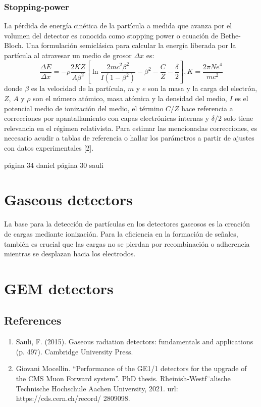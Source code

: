 \documentclass[]{book}
\begin{document}
\subsubsection{Stopping-power}

\noindent La pérdida de energía cinética de la partícula a medida que avanza por el volumen del detector es conocida como stopping power o ecuación de Bethe-Bloch. Una formulación semiclásica para calcular la energía liberada por la partícula al atravesar un medio de grosor $\Delta x$ es: $$
\frac{\Delta E}{\Delta x}=-\rho \frac{2 K Z}{A \beta^2}\left[\ln \frac{2 m c^2 \beta^2}{I\left(1-\beta^2\right)}-\beta^2-\frac{C}{Z}-\frac{\delta}{2}\right], K = \frac{2 \pi N e^{4}}{mc^{2}}
$$
donde $\beta$ es la velocidad de la partícula, $m$ y $e$ son la masa y la carga del electrón, $Z$, $A$ y $\rho$ son el número atómico, masa atómica y la densidad del medio, $I$ es el potencial medio de ionización del medio, el término $C/Z$ hace referencia a correcciones por apantallamiento con capas electrónicas internas y $\delta /2$ solo tiene relevancia en el régimen relativista. Para estimar las mencionadas correcciones, es necesario acudir a tablas de referencia o hallar los parámetros a partir de ajustes con datos experimentales [2].

página 34 daniel
página 30 sauli

\section{Gaseous detectors}

\noindent La base para la detección de partículas en los detectores gaseosos es la creación de cargas mediante ionización. Para la eficiencia en la formación de señales, también es crucial que las cargas no se pierdan por recombinación o adherencia mientras se desplazan hacia los electrodos.

\section{GEM detectors}

\subsection*{References}
\begin{enumerate}
    \item Sauli, F. (2015). Gaseous radiation detectors: fundamentals and applications (p. 497). Cambridge University Press.
    \item Giovani Mocellin. “Performance of the GE1/1 detectors for the upgrade of the
    CMS Muon Forward system”. PhD thesis. Rheinish-Westf¨alische Technische
    Hochschule Aachen University, 2021. url: https://cds.cern.ch/record/
    2809098.
\end{enumerate}
\end{document}
